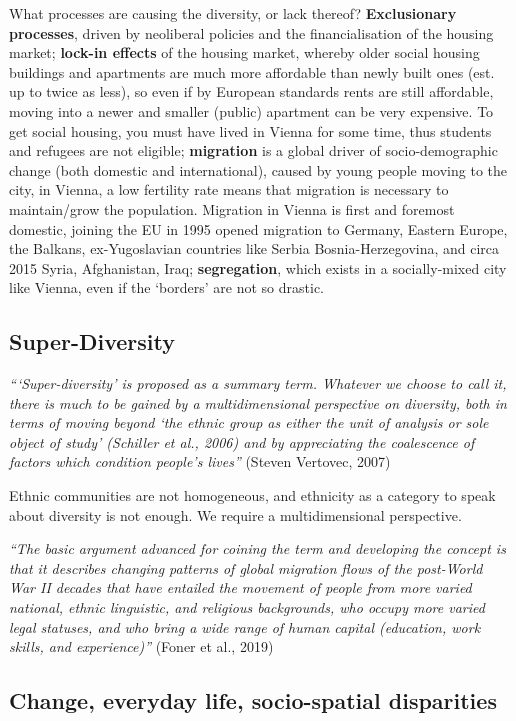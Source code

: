 \documentclass{article}
\begin{document}
What processes are causing the diversity, or lack thereof? \textbf{Exclusionary processes}, driven by neoliberal policies and the financialisation of the housing market; 
\textbf{lock-in effects} of the housing market, whereby older social housing buildings and apartments are much more affordable than newly built ones (est. up to twice as less), so even if by European standards rents are still affordable, moving into a newer and smaller (public) apartment can be very expensive. To get social housing, you must have lived in Vienna for some time, thus students and refugees are not eligible;
\textbf{migration} is a global driver of socio-demographic change (both domestic and international), caused by young people moving to the city, in Vienna, a low fertility rate means that migration is necessary to maintain/grow the population. Migration in Vienna is first and foremost domestic, joining the EU in 1995 opened migration to Germany, Eastern Europe, the Balkans, ex-Yugoslavian countries like Serbia Bosnia-Herzegovina, and circa 2015 Syria, Afghanistan, Iraq; 
\textbf{segregation}, which exists in a socially-mixed city like Vienna, even if the `borders' are not so drastic.

\subsection{Super-Diversity}

\textit{```Super-diversity' is proposed as a summary term. Whatever we choose to call it, there is much to be gained by a multidimensional perspective on diversity, both in terms of moving beyond `the ethnic group as either the unit of analysis or sole object of study' (Schiller et al., 2006) and by appreciating the coalescence of factors which condition people's lives''} (Steven Vertovec, 2007)

Ethnic communities are not homogeneous, and ethnicity as a category to speak about diversity is not enough. We require a multidimensional perspective.

\textit{``The basic argument advanced for coining the term and developing the concept is that it describes changing patterns of global migration flows of the post-World War II decades that have entailed the movement of people from more varied national, ethnic linguistic, and religious backgrounds, who occupy more varied legal statuses, and who bring a wide range of human capital (education, work skills, and experience)''} (Foner et al., 2019)

\subsection{Change, everyday life, socio-spatial disparities}
\end{document}
